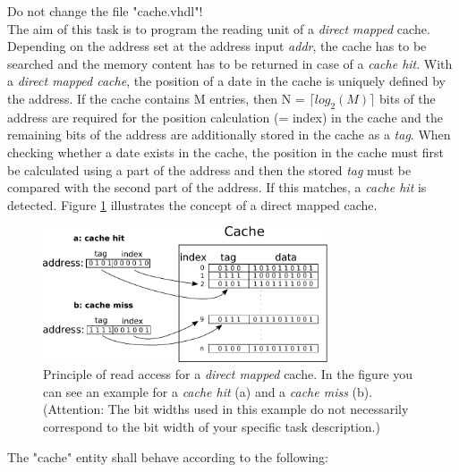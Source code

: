 \documentclass[a4paper,12pt]{article}
\begin{document}
Do not change the file "cache.vhdl"!\\

The aim of this task is to program the reading unit of a \textit{direct mapped} cache. Depending on the address set at the address input \textit{addr}, the cache has to be searched and the memory content has to be returned in case of a \textit{cache hit}. With a \textit{direct mapped cache}, the position of a date in the cache is uniquely defined by the address. If the cache contains M entries, then N = $\lceil log_2(M) \rceil$ bits of the address are required for the position calculation (= index) in the cache and the remaining bits of the address are additionally stored in the cache as a \textit{tag}.
When checking whether a date exists in the cache, the position in the cache must first be calculated using a part of the address and then the stored \textit{tag} must be compared with the second part of the address. If this matches, a \textit{cache hit} is detected. Figure \ref{img_cache} illustrates the concept of a direct mapped cache.
 

\begin{figure}[h]
\begin{center}
\includegraphics[width=0.75\textwidth]{../static/cache.pdf}
\caption{Principle of read access for a \textit{direct mapped} cache. In the figure you can see an example for a \textit{cache hit} (a) and a \textit{cache miss} (b). \newline (Attention: The bit widths used in this example do not necessarily correspond to the bit width of your specific task description.)}
\label{img_cache}
\end{center}
\end{figure}

The "cache" entity shall behave according to the following:\\
\end{document}
